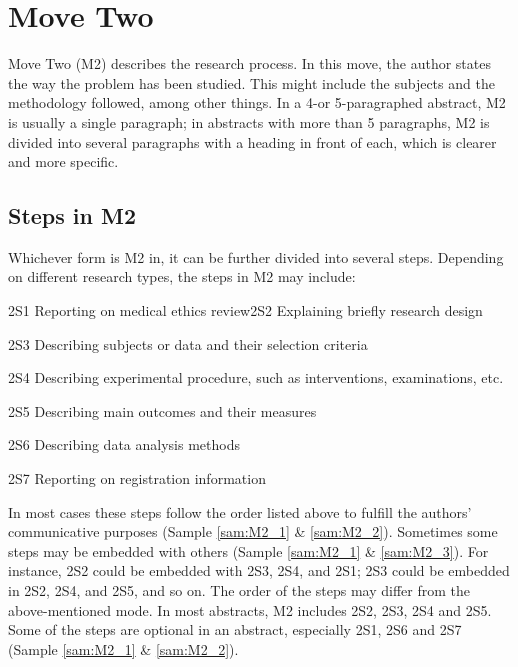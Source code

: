 \documentclass[a4paper]{ctexbook}
\begin{document}
\chapter{Move Two}\label{chapter4}

Move Two (M2) describes the research process. In this move, the author states the way the problem has been studied. This might include the subjects and the methodology followed, among other things. In a 4-or 5-paragraphed abstract, M2 is usually a single paragraph; in abstracts with more than 5 paragraphs, M2 is divided into several paragraphs with a heading in front of each, which is clearer and more specific.

\section{Steps in M2}

Whichever form is M2 in, it can be further divided into several steps. Depending on different research types, the steps in M2 may include:

2S1 Reporting on medical ethics review2S2 Explaining briefly research design

2S3 Describing subjects or data and their selection criteria

2S4 Describing experimental procedure, such as interventions, examinations, etc.

2S5 Describing main outcomes and their measures

2S6 Describing data analysis methods

2S7 Reporting on registration information 

In most cases these steps follow the order listed above to fulfill the authors' communicative purposes (Sample \ref{sam:M2_1} \& \ref{sam:M2_2}). Sometimes some steps may be embedded with others (Sample \ref{sam:M2_1} \& \ref{sam:M2_3}). For instance, 2S2 could be embedded with 2S3, 2S4, and 2S1; 2S3 could be embedded in 2S2, 2S4, and 2S5, and so on. The order of the steps may differ from the above-mentioned mode. In most abstracts, M2 includes 2S2, 2S3, 2S4 and 2S5. Some of the steps are optional in an abstract, especially 2S1, 2S6 and 2S7 (Sample \ref{sam:M2_1} \& \ref{sam:M2_2}).
\end{document}
